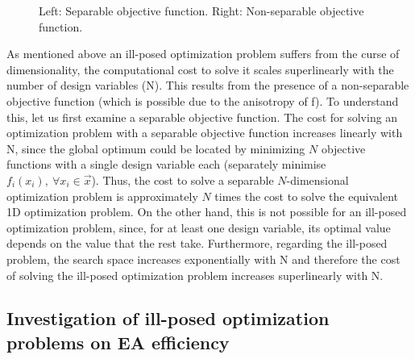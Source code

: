 \begin{figure}[h!]
\begin{minipage}[b]{1\linewidth}
 \centering
\end{minipage}
\caption{Left: Separable objective function. Right: Non-separable objective function.} 
\label{nonsep}
\end{figure}

As mentioned above an ill-posed optimization problem suffers from the curse of dimensionality, the computational cost to solve it scales superlinearly with the number of design variables (N). This results from the presence of a non-separable objective function (which is possible due to the anisotropy of f). To understand this, let us first examine a separable objective function. The cost for solving an optimization problem with a separable objective function increases linearly with N, since the global optimum could be located by minimizing $N$ objective functions with a single design variable each (separately minimise $f_i(x_i),~ \forall x_i \in \vec{x}$). Thus, the cost to solve a separable $N$-dimensional optimization problem is approximately $N$ times the cost to solve the equivalent 1D optimization problem. On the other hand, this is not possible for an ill-posed optimization problem, since, for at least one design variable, its optimal value depends on the value that the rest take. Furthermore, regarding the ill-posed problem, the search space increases exponentially with N and therefore the cost of solving the ill-posed optimization problem increases superlinearly with N.   
 
\subsection{Investigation of ill-posed optimization problems on EA efficiency}
\label{Inv2}


